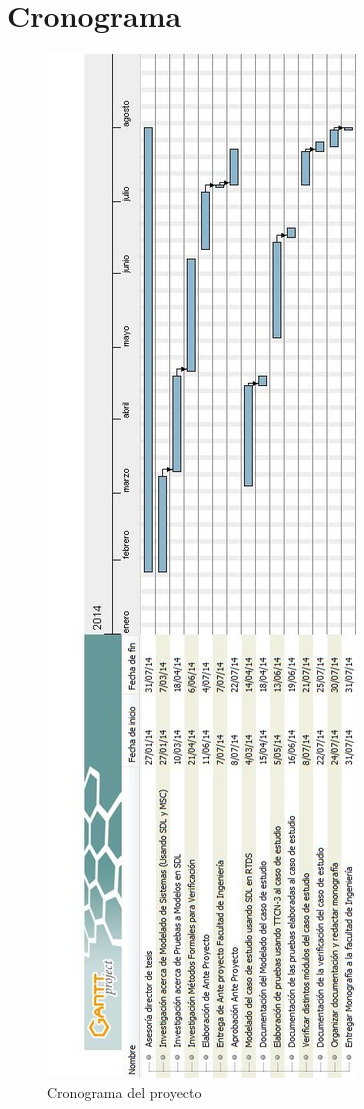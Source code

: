 \newpage

\section{Cronograma}

\begin{figure}[!h]
  \centering
  \includegraphics[scale=0.6]{./images/CronogramaJPGR.jpg}
  \caption{Cronograma del proyecto}
  \label{fig:cronograma}
\end{figure}

